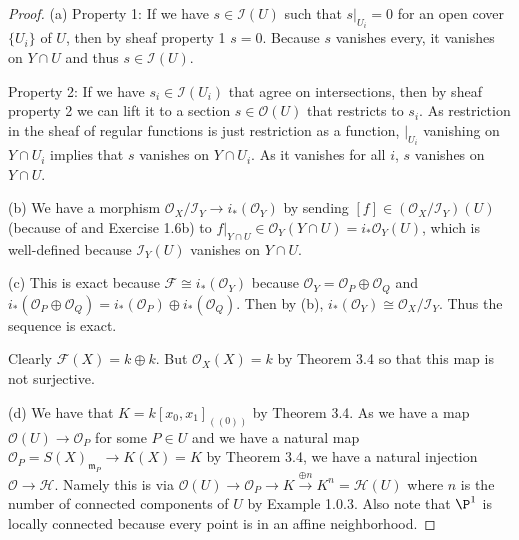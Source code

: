\begin{proof}
	(a) Property 1: If we have $s \in \mathscr{I}(U) $ such that $s|_{U_i} = 0 $ for an open cover $\{U_i\}   $ of $U $, then by sheaf property 1 $s=0 $.
	Because $s$ vanishes every, it vanishes on $Y \cap U $ and thus $s \in \mathscr{I}(U) $.

	Property 2: If we have $s_i \in \mathscr{I}(U_i) $ that agree on intersections, then by sheaf property 2 we can lift it to a section $s \in \mathcal{O}(U) $ that restricts to $s_i $.
	As restriction in the sheaf of regular functions is just restriction as a function, $|_{U_i} $ vanishing on $Y\cap U_i $ implies that $s $ vanishes on $Y\cap U_i $.
	As it vanishes for all $i $, $s $ vanishes on $Y \cap U $.

	(b) We have a morphism $\mathcal{O}_X / \mathscr{I}_Y \to i_\ast(\mathcal{O}_Y) $ by sending $[f] \in (\mathcal{O}_X / \mathscr{I}_Y)(U) $ (because of  and Exercise 1.6b) to $f|_{Y\cap U} \in \mathcal{O}_Y(Y \cap U) = i_\ast\mathcal{O}_Y(U) $, which is well-defined because $\mathscr{I}_Y(U) $ vanishes on $Y\cap U $.

	(c) This is exact because $\mathscr{F} \cong i_\ast(\mathcal{O}_Y)  $ because $\mathcal{O}_Y = \mathcal{O}_P \oplus \mathcal{O}_Q $ and $i_\ast(\mathcal{O}_P \oplus \mathcal{O}_Q) = i_\ast(\mathcal{O}_P) \oplus i_\ast(\mathcal{O}_Q)$.
	Then by (b), $i_\ast(\mathcal{O}_Y) \cong \mathcal{O}_X / \mathscr{I}_Y $.
	Thus the sequence is exact.

	Clearly $\mathscr{F}(X) = k \oplus k $.
	But $\mathcal{O}_X(X) = k $ by Theorem 3.4 so that this map is not surjective.

	(d) We have that $K = k[x_{0},x_{1}]_{((0))}$ by Theorem 3.4.
	As we have a map $\mathcal{O}(U) \to \mathcal{O}_P $ for some $P \in U $ and we have a natural map $\mathcal{O}_P = S(X)_{\mathfrak{m}_P} \to K(X) = K $ by Theorem 3.4, we have a natural injection $\mathcal{O}\to \mathscr{H} $.
	Namely this is via $\mathcal{O}(U) \to \mathcal{O}_P \to K \xrightarrow{\oplus n} K^n = \mathscr{H}(U) $ where $n $ is the number of connected components of $U $ by Example 1.0.3.
	Also note that $\P^1 $ is locally connected because every point is in an affine neighborhood.


\end{proof}
